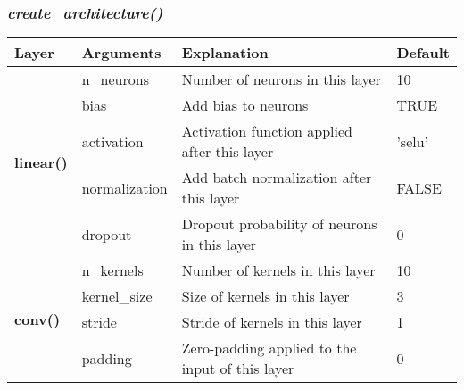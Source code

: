 \documentclass{article}
\begin{document}
\subsubsection{\textit{create{\_}architecture()}}
\begin{table}[]
	\begin{tabular}{llll}
		\hline
		Layer                                & Arguments     & Explanation                                                                                                                       & Default   \\ \hline
		\multirow{5}{*}{\textbf{linear()}}   & n\_neurons    & Number of neurons in this layer                                                                                                   & 10        \\
		& bias          & Add bias to neurons                                                                                                               & TRUE      \\
		& activation    & Activation function applied after this layer                                                                                      & 'selu'    \\
		& normalization & Add batch normalization after this layer                                                                                          & FALSE     \\
		& dropout       & Dropout probability of neurons in this layer                                                                                      & 0         \\ \hline
		\multirow{9}{*}{\textbf{conv()}}     & n\_kernels    & Number of kernels in this layer                                                                                                   & 10        \\
		& kernel\_size  & Size of kernels in this layer                                                                                                     & 3         \\
		& stride        & Stride of kernels in this layer                                                                                                   & 1         \\
		& padding       & Zero-padding applied to the input of this layer                                                                                   & 0         \\

\end{tabular}
\end{table}
\end{document}
